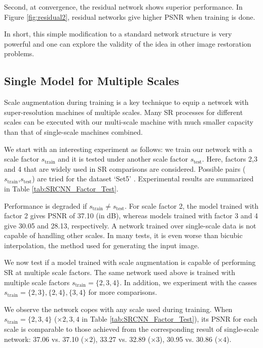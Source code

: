 \documentclass[10pt,twocolumn,letterpaper]{article}
\begin{document}
Second, at convergence, the residual network shows superior performance. In Figure \ref{fig:residual2}, residual networks give higher PSNR when training is done.

In short, this simple modification to a standard network structure is very powerful and one can explore the validity of the idea in other image restoration problems. 

\subsection{Single Model for Multiple Scales}
Scale augmentation during training is a key technique to equip a network with super-resolution machines of multiple scales. Many SR processes for different scales can be executed with our multi-scale machine with much smaller capacity than that of single-scale machines combined. 

We start with an interesting experiment as follows: we train our network with a scale factor $s_{\text{train}}$ and it is tested under another scale factor $s_{\text{test}}$. Here, factors 2,3 and 4 that are widely used in SR comparisons are considered. Possible pairs ($s_{\text{train}}$,$s_{\text{test}}$) are tried for the dataset `Set5' \cite{bevilacqua2012}. Experimental results are summarized in Table \ref{tab:SRCNN_Factor_Test}. 

Performance is degraded if $s_{\text{train}} \neq s_{\text{test}}$. For scale factor 2, the model trained with factor 2 gives PSNR of 37.10 (in dB), whereas models trained with factor 3 and 4 give 30.05 and 28.13, respectively. A network trained over single-scale data is not capable of handling other scales. In many tests, it is even worse than bicubic interpolation, the method used for generating the input image. 

We now test if a model trained with scale augmentation is capable of performing SR at multiple scale factors. The same network used above is trained with multiple scale factors $s_{\text{train}} = \{2,3,4\}$. In addition, we experiment with the casses $s_{\text{train}} = \{2,3\}, \{2,4\}, \{3,4\}$ for more comparisons. 

We observe the network copes with any scale used during training. When $s_{\text{train}} = \{2,3,4\}$ ($\times 2, 3, 4$ in Table \ref{tab:SRCNN_Factor_Test}), its PSNR for each scale is comparable to those achieved from the corresponding result of single-scale network: 37.06 vs. 37.10 ($\times 2$), 33.27 vs. 32.89 ($\times 3$), 30.95 vs. 30.86 ($\times 4$).
\end{document}
